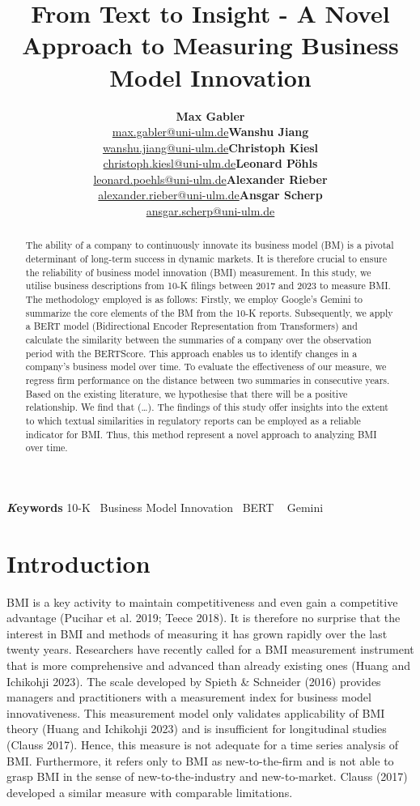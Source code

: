 \documentclass[
]{article}
\title{From Text to Insight - A Novel Approach to Measuring Business
Model Innovation}
\author{\textbf{Max
Gabler}\\\href{mailto:max.gabler@uni-ulm.de}{max.gabler@uni-ulm.de}\asep\textbf{Wanshu
Jiang}\\\href{mailto:wanshu.jiang@uni-ulm.de}{wanshu.jiang@uni-ulm.de}\asep\textbf{Christoph
Kiesl}\\\href{mailto:christoph.kiesl@uni-ulm.de}{christoph.kiesl@uni-ulm.de}\asep\textbf{Leonard
Pöhls}\\\href{mailto:leonard.poehls@uni-ulm.de}{leonard.poehls@uni-ulm.de}\asep\textbf{Alexander
Rieber}\\\href{mailto:alexander.rieber@uni-ulm.de}{alexander.rieber@uni-ulm.de}\asep\textbf{Ansgar
Scherp}\\\href{mailto:ansgar.scherp@uni-ulm.de}{ansgar.scherp@uni-ulm.de}}
\date{}
\begin{document}
\maketitle
\begin{abstract}
The ability of a company to continuously innovate its business model
(BM) is a pivotal determinant of long-term success in dynamic markets.
It is therefore crucial to ensure the reliability of business model
innovation (BMI) measurement. In this study, we utilise business
descriptions from 10-K filings between 2017 and 2023 to measure BMI. The
methodology employed is as follows: Firstly, we employ Google's Gemini
to summarize the core elements of the BM from the 10-K reports.
Subsequently, we apply a BERT model (Bidirectional Encoder
Representation from Transformers) and calculate the similarity between
the summaries of a company over the observation period with the
BERTScore. This approach enables us to identify changes in a company's
business model over time. To evaluate the effectiveness of our measure,
we regress firm performance on the distance between two summaries in
consecutive years. Based on the existing literature, we hypothesise that
there will be a positive relationship. We find that (\ldots). The
findings of this study offer insights into the extent to which textual
similarities in regulatory reports can be employed as a reliable
indicator for BMI. Thus, this method represent a novel approach to
analyzing BMI over time.
\end{abstract}
{\bfseries \emph Keywords}
\def\sep{\textbullet\ }
10-K \sep Business Model Innovation \sep BERT \sep 
Gemini


\newpage{}

\section{Introduction}\label{introduction}

BMI is a key activity to maintain competitiveness and even gain a
competitive advantage (Pucihar et al. 2019; Teece 2018). It is therefore
no surprise that the interest in BMI and methods of measuring it has
grown rapidly over the last twenty years. Researchers have recently
called for a BMI measurement instrument that is more comprehensive and
advanced than already existing ones (Huang and Ichikohji 2023). The
scale developed by Spieth \& Schneider (2016) provides managers and
practitioners with a measurement index for business model
innovativeness. This measurement model only validates applicability of
BMI theory (Huang and Ichikohji 2023) and is insufficient for
longitudinal studies (Clauss 2017). Hence, this measure is not adequate
for a time series analysis of BMI. Furthermore, it refers only to BMI as
new-to-the-firm and is not able to grasp BMI in the sense of
new-to-the-industry and new-to-market. Clauss (2017) developed a similar
measure with comparable limitations.
\end{document}
